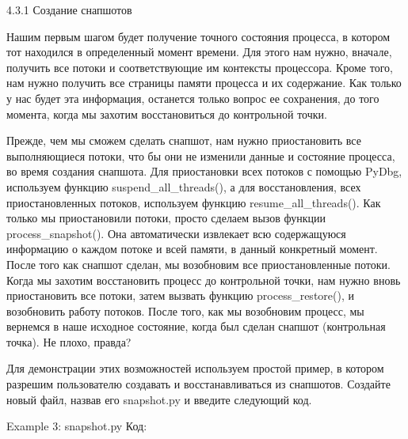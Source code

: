 \documentclass[12pt]{book}
\begin{document}
4.3.1 Создание снапшотов

Нашим первым шагом будет получение точного состояния процесса, в котором тот находился в определенный момент времени. Для этого нам нужно, вначале, получить все потоки и соответствующие им контексты процессора. Кроме того, нам нужно получить все страницы памяти процесса и их содержание. Как только у нас будет эта информация, останется только вопрос ее сохранения, до того момента, когда мы захотим восстановиться до контрольной точки. 

Прежде, чем мы сможем сделать снапшот, нам нужно приостановить все выполняющиеся потоки, что бы они не изменили данные и состояние процесса, во время создания снапшота. Для приостановки всех потоков с помощью PyDbg, используем функцию suspend\_all\_threads(), а для восстановления, всех приостановленных потоков, используем функцию resume\_all\_threads(). Как только мы приостановили потоки, просто сделаем вызов функции process\_snapshot(). Она автоматически извлекает всю содержащуюся информацию о каждом потоке и всей памяти, в данный конкретный момент. После того как снапшот сделан, мы возобновим все приостановленные потоки. Когда мы захотим восстановить процесс до контрольной точки, нам нужно вновь приостановить все потоки, затем вызвать функцию process\_restore(), и возобновить работу потоков. После того, как мы возобновим процесс, мы вернемся в наше исходное состояние, когда был сделан снапшот (контрольная точка). Не плохо, правда?

Для демонстрации этих возможностей используем простой пример, в котором разрешим пользователю создавать и восстанавливаться из снапшотов. Создайте новый файл, назвав его snapshot.py и введите следующий код.

Example 3: snapshot.py
Код:


    

\end{document}
